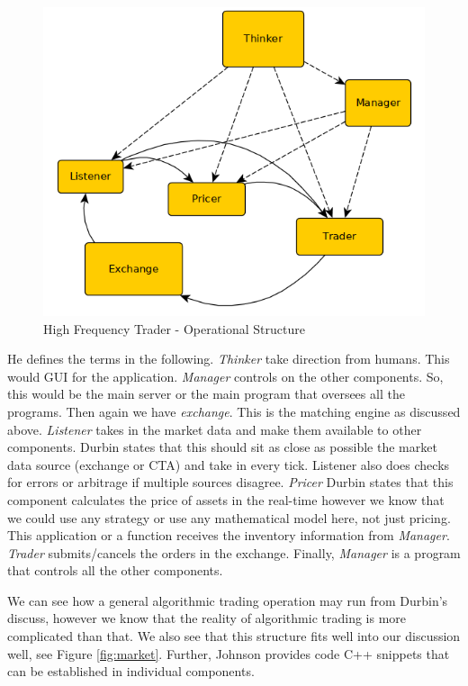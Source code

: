 \documentclass[12pt]{article}
\begin{document}
\begin{figure}[h!]
	\centering
    \includegraphics[scale=0.55]{component.png}
    \caption{High Frequency Trader - Operational Structure}
    \label{fig:component}
\end{figure}

He defines the terms in the following. \textit{Thinker} take direction from humans. This would GUI for the application. \textit{Manager} controls on the other components. So, this would be the main server or the main program that oversees all the programs. Then again we have \textit{exchange}. This is the matching engine as discussed above. \textit{Listener} takes in the market data and make them available to other components. Durbin states that this should sit as close as possible the market data source (exchange or CTA) and take in every tick. Listener also does checks for errors or arbitrage if multiple sources disagree. \textit{Pricer} Durbin states that this component calculates the price of assets in the real-time however we know that we could use any strategy or use any mathematical model here, not just pricing. This application or a function receives the inventory information from \textit{Manager}. \textit{Trader} submits/cancels the orders in the exchange. Finally, \textit{Manager} is a program that controls all the other components.

We can see how a general algorithmic trading operation may run from Durbin's discuss, however we know that the reality of algorithmic trading is more complicated than that. We also see that this structure fits well into our discussion well, see Figure \ref{fig:market}. Further, Johnson \cite{johnson} provides code C++ snippets that can be established in individual components.
\end{document}
